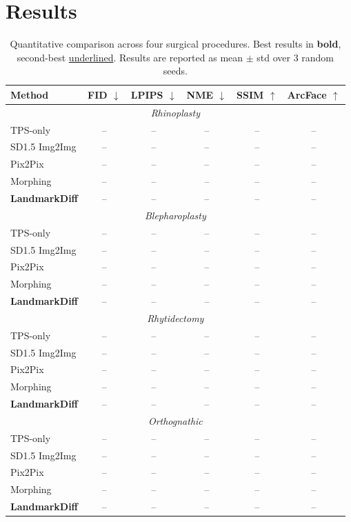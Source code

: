 \documentclass[runningheads]{llncs}
\newcommand{\method}{LandmarkDiff}
\begin{document}
\section{Results}
\label{sec:results}

\begin{table}[t]
\centering
\caption{Quantitative comparison across four surgical procedures.
Best results in \textbf{bold}, second-best \underline{underlined}.
Results are reported as mean $\pm$ std over 3 random seeds.}
\label{tab:results}
\small
\begin{tabular}{@{}lccccc@{}}
\toprule
Method & FID $\downarrow$ & LPIPS $\downarrow$ & NME $\downarrow$ & SSIM $\uparrow$ & ArcFace $\uparrow$ \\
\midrule
\multicolumn{6}{c}{\textit{Rhinoplasty}} \\
\midrule
TPS-only          & --    & --    & --    & --    & --   \\
SD1.5 Img2Img     & --    & --    & --    & --    & --   \\
Pix2Pix           & --    & --    & --    & --    & --   \\
Morphing          & --    & --    & --    & --    & --   \\
\textbf{\method{}} & --   & --    & --    & --    & --   \\
\midrule
\multicolumn{6}{c}{\textit{Blepharoplasty}} \\
\midrule
TPS-only          & --    & --    & --    & --    & --   \\
SD1.5 Img2Img     & --    & --    & --    & --    & --   \\
Pix2Pix           & --    & --    & --    & --    & --   \\
Morphing          & --    & --    & --    & --    & --   \\
\textbf{\method{}} & --   & --    & --    & --    & --   \\
\midrule
\multicolumn{6}{c}{\textit{Rhytidectomy}} \\
\midrule
TPS-only          & --    & --    & --    & --    & --   \\
SD1.5 Img2Img     & --    & --    & --    & --    & --   \\
Pix2Pix           & --    & --    & --    & --    & --   \\
Morphing          & --    & --    & --    & --    & --   \\
\textbf{\method{}} & --   & --    & --    & --    & --   \\
\midrule
\multicolumn{6}{c}{\textit{Orthognathic}} \\
\midrule
TPS-only          & --    & --    & --    & --    & --   \\
SD1.5 Img2Img     & --    & --    & --    & --    & --   \\
Pix2Pix           & --    & --    & --    & --    & --   \\
Morphing          & --    & --    & --    & --    & --   \\
\textbf{\method{}} & --   & --    & --    & --    & --   \\
\bottomrule
\end{tabular}
\end{table}
\end{document}
